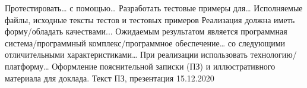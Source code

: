 {      {}{}
    \projecttask{\projectsubtasknum}
      {Протестировать… с помощью…}
      {}
      {}{}
    \projecttask{\projectsubtasknum}
      {Разработать тестовые примеры для… }
      {Исполняемые файлы, исходные тексты тестов и тестовых примеров}
      {}{}
    \projecttask{\projectsubtasknum}
      {Реализация должна иметь форму/обладать качествами...}
      {}
      {}{}
    \projecttask{\projectsubtasknum}
      {Ожидаемым результатом является программная система/программный комплекс/программное обеспечение… со следующими отличительными характеристиками…}
      {}
      {}{}
    \projecttask{\projectsubtasknum}
      {При реализации использовать технологию/платформу…}
      {}
      {}{}
  \projecttask{\projecttasknum}
    {Оформление пояснительной записки (ПЗ) и иллюстративного материала для доклада.}
    {Текст ПЗ, презентация}
    {15.12.2020}{}
}

\taskliterature{
\nocite{Sychev}
\nocite{Sokolov}
\nocite{Gaidaenko}
}

